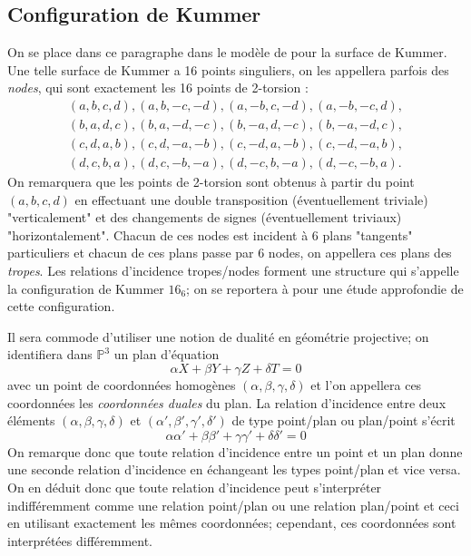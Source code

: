 \documentclass[a4paper]{article}
\theoremstyle{definition}
\theoremstyle{remark}
\numberwithin{equation}{section}
\begin{document}
\subsection{Configuration de Kummer}
On se place dans ce paragraphe dans le modèle de \citet{gaudry} pour la surface de Kummer. Une telle surface de Kummer a 16 points singuliers, on les appellera parfois des \emph{nodes}, qui sont exactement les 16 points de 2-torsion :
\begin{align*}
   &(a,b,c,d),(a,b,-c,-d),(a,-b,c,-d),(a,-b,-c,d),& \\
   &(b,a,d,c),(b,a,-d,-c),(b,-a,d,-c),(b,-a,-d,c),& \\
   &(c,d,a,b),(c,d,-a,-b),(c,-d,a,-b),(c,-d,-a,b),& \\
   &(d,c,b,a),(d,c,-b,-a),(d,-c,b,-a),(d,-c,-b,a).&
\end{align*}
On remarquera que les points de 2-torsion sont obtenus à partir du point $(a,b,c,d)$ en effectuant une double transposition (éventuellement triviale) "verticalement" et des changements de signes (éventuellement triviaux) "horizontalement".
Chacun de ces nodes est incident à 6 plans "tangents" particuliers et chacun de ces plans passe par 6 nodes, on appellera ces plans des \emph{tropes}. Les relations d'incidence tropes/nodes forment une structure qui s'appelle la configuration de Kummer $16_6$; on se reportera à \citep{hudson} pour une étude approfondie de cette configuration.

Il sera commode d'utiliser une notion de dualité en géométrie projective; on identifiera dans $\mathbb{P}^3$ un plan d'équation $$\alpha X + \beta Y + \gamma Z + \delta T = 0$$ avec un point de coordonnées homogènes $(\alpha, \beta, \gamma, \delta)$ et l'on appellera ces coordonnées les \emph{coordonnées duales} du plan. La relation d'incidence entre deux éléments $(\alpha, \beta, \gamma, \delta)$ et $(\alpha', \beta', \gamma', \delta')$ de type point/plan ou plan/point s'écrit
$$\alpha\alpha' + \beta\beta' + \gamma\gamma' + \delta\delta' = 0$$
On remarque donc que toute relation d'incidence entre un point et un plan donne une seconde relation d'incidence en échangeant les types point/plan et vice versa. On en déduit donc que toute relation d'incidence peut s'interpréter indifféremment comme une relation point/plan ou une relation plan/point et ceci en utilisant exactement les mêmes coordonnées; cependant, ces coordonnées sont interprétées différemment.
\end{document}
